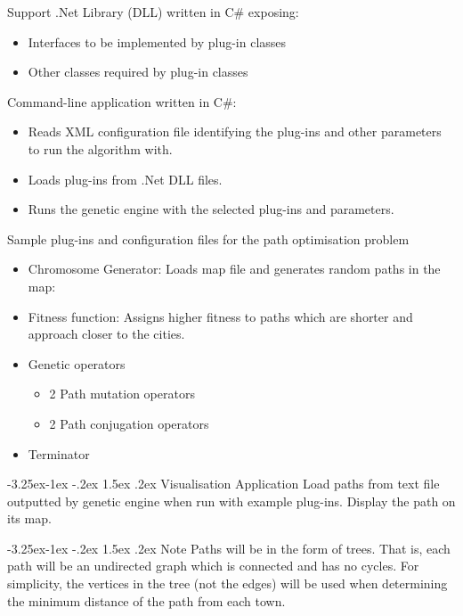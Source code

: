 \documentclass[a4paper]{article}
\makeatletter
\renewcommand\paragraph{\@startsection{paragraph}{4}{\z@}%
  {-3.25ex\@plus -1ex \@minus -.2ex}%
  {1.5ex \@plus .2ex}%
  {\normalfont\normalsize\bfseries}}
\makeatother
\begin{document}
Support .Net Library (DLL) written in C\# exposing:
\begin{itemize}
 \item Interfaces to be implemented by plug-in classes
 \item Other classes required by plug-in classes
\end{itemize}

Command-line application written in C\#:
\begin{itemize}
 \item Reads XML configuration file identifying the plug-ins and other parameters to run the algorithm with.
 \item Loads plug-ins from .Net DLL files.
 \item Runs the genetic engine with the selected plug-ins and parameters.
\end{itemize}

Sample plug-ins and configuration files for the path optimisation problem
\begin{itemize}
 \item{Chromosome Generator}: Loads map file and generates random paths in the map:
 \item{Fitness function}: Assigns higher fitness to paths which are shorter and approach closer to the cities.
 \item{Genetic operators}
 \begin{itemize}
  \item 2 Path mutation operators 
  \item 2 Path conjugation operators
 \end{itemize}
 \item Terminator
\end{itemize}

\paragraph{Visualisation Application}
Load paths from text file outputted by genetic engine when run with example plug-ins.
Display the path on its map.

\paragraph{Note}
Paths will be in the form of trees. That is, each path will be an undirected graph which is connected and has no cycles. For simplicity, the vertices in the tree (not the edges) will be used when determining the minimum distance of the path from each town.
\end{document}
